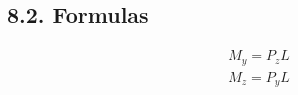 
\subsection*{8.2. Formulas}

\begin{gather*}
    M_y = P_z L \\
    M_z = P_y L \\
\end{gather*}


